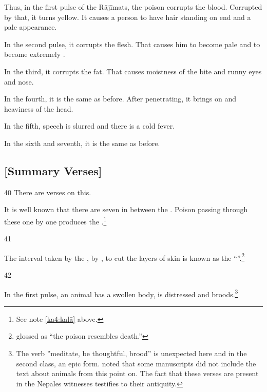 \begin{translation}
Thus, in the first pulse of the Rājīmats, the poison corrupts the blood. 
Corrupted by that, it turns yellow.  It causes a person to have hair standing on 
end and a pale appearance. 

In the second pulse, it corrupts the flesh. That causes him to become
pale and to become extremely .

In the third, it corrupts the fat.  That causes moistness of the bite and runny eyes 
and nose. 

In the fourth, it is the same as before.  After penetrating, it brings on 
 and heaviness of the head.

In the fifth, speech is slurred and there is a cold fever.

In the sixth and seventh, it is the same as before. 



\subsection{[Summary Verses]}

\item[40]
There are verses on this.

\begin{sloka}
It is well known that there are seven  in
between the .  Poison passing through these one
by one produces the .\footnote{See note \ref{ka4:kalā}
    above.}
\end{sloka}


\item[41]
\begin{sloka}
The interval taken by the ,  by , to cut the layers of 
    skin is
known as the “”.\footnote{ glossed  as
     “the poison resembles death.”}
\end{sloka}


\item[42]

\begin{sloka}
    In the first pulse, an animal has a swollen body, is distressed and
broods.\footnote{The verb \root{} ”meditate, be
    thoughtful, brood” is unexpected here and in the  second class, an
    epic form.  noted that some manuscripts did not
    include the text about animals from this point on.  The fact that
    these verses are present in the Nepales witnesses testifies to their
    antiquity.}
    

\end{sloka}
\end{translation}
